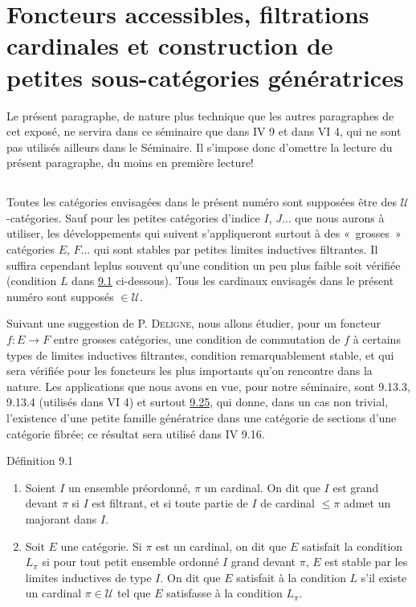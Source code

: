 \section{Foncteurs accessibles, filtrations cardinales et construction
de petites sous-catégories génératrices}

Le présent paragraphe, de nature plus technique que les autres
paragraphes de cet exposé, ne servira dans ce séminaire que dans IV
9 et dans VI 4, qui ne sont pas utilisés ailleurs dans le Séminaire.
Il s'impose donc d'omettre la lecture du présent paragraphe, du
moins en première lecture!

\setcounter{subsection}{-1}
\subsection{}
Toutes les catégories envisagées dans le présent numéro sont
supposées être des $𝒰$-catégories. Sauf pour les petites
catégories d'indice $I$, $J\ldots$ que nous aurons à utiliser, les
développements qui suivent s'appliqueront surtout à des « grosses »
catégories $E$, $F\ldots$ qui sont stables par petites limites
inductives filtrantes. Il suffira cependant le\pageoriginale plus
souvent qu'une condition un peu plus faible soit vérifiée (condition
$L$ dans \hyperref[I.def9.1]{9.1} ci-dessous). Tous les cardinaux envisagés dans le
présent numéro sont supposés $\in 𝒰$.

Suivant une suggestion de P. \textsc{Deligne}, nous allons étudier,
pour un foncteur $f:E\rightarrow F$ entre grosses catégories, une
condition de commutation de $f$ à certains types de limites
inductives filtrantes, condition remarquablement stable, et qui sera
vérifiée pour les foncteurs les plus importants qu'on rencontre dans
la nature. Les applications que nous avons en vue, pour notre
séminaire, sont 9.13.3, 9.13.4 (utilisés dans VI
4) et surtout \hyperref[I.cor9.25]{9.25},
qui donne, dans un cas non trivial, l'existence d'une petite famille
génératrice dans une catégorie de sections d'une
catégorie fibrée;
ce résultat sera utilisé dans IV 9.16.

\begin{enonce*}{Définition 9.1}
\begin{enumerate}
\renewcommand{\theenumi}{\alph{enumi}}
\renewcommand{\labelenumi}{\theenumi)}
\item Soient $I$ un ensemble préordonné, $\pi$ un cardinal. On
dit que $I$ est grand devant $\pi$ si $I$ est filtrant, et si toute
partie de $I$ de cardinal $\leq \pi$ admet un majorant dans $I$.

\item Soit $E$ une catégorie. Si $\pi$ est un cardinal, on dit que
$E$ satisfait la condition $L_{\pi}$ si pour tout petit ensemble
ordonné $I$ grand devant $\pi$, $E$ est stable par les limites
inductives de type $I$. On dit que $E$ satisfait à la condition $L$
s'il existe un cardinal $\pi\in 𝒰$ tel que $E$ satisfasse à
la condition $L_{\pi}$.
\end{enumerate}
\end{enonce*}

